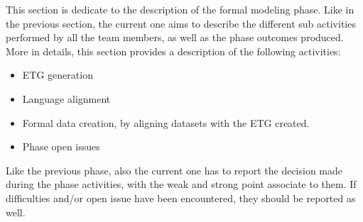 This section is dedicate to the description of the formal modeling phase. Like in the previous section, the current one aims to describe the different sub activities performed by all the team members, as well as the phase outcomes produced.\\

\noindent More in details, this section provides a description of the following activities:
\begin{itemize}
    \item ETG generation
    \item Language alignment
    \item Formal data creation, by aligning datasets with the ETG created.
    \item Phase open issues
\end{itemize}

\noindent Like the previous phase, also the current one has to report the decision made during the phase activities, with the weak and strong point associate to them. If difficulties and/or open issue have been encountered, they should be reported as well.
